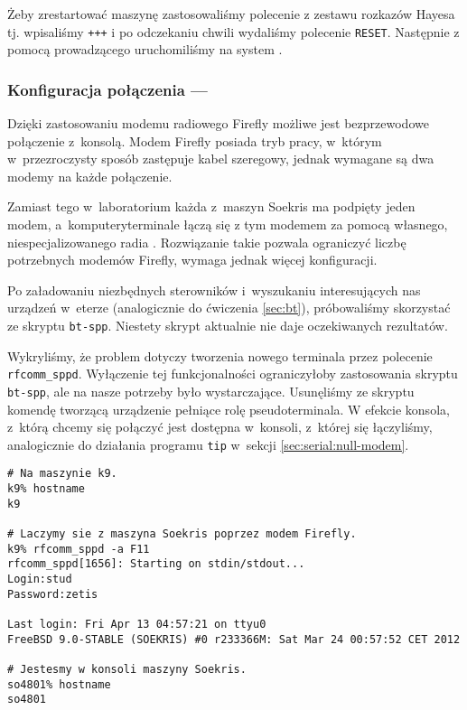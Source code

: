 Żeby zrestartować maszynę \zielone{} zastosowaliśmy polecenie z zestawu rozkazów
Hayesa tj. wpisaliśmy \texttt{+++} i po odczekaniu chwili wydaliśmy polecenie
\texttt{RESET}. Następnie z pomocą prowadzącego uruchomiliśmy na \zielone{}
system \bsd.

\subsubsection{Konfiguracja połączenia --- \bt}

Dzięki zastosowaniu modemu radiowego Firefly możliwe jest bezprzewodowe
połączenie z~konsolą. Modem Firefly posiada tryb pracy, w~którym w~przezroczysty
sposób zastępuje kabel szeregowy, jednak wymagane są dwa modemy na każde
połączenie.

Zamiast tego w~laboratorium każda z~maszyn Soekris ma podpięty jeden modem,
a~komputery\dywiz terminale łączą się z tym modemem za pomocą własnego,
niespecjalizowanego radia \bt. Rozwiązanie takie pozwala ograniczyć liczbę
potrzebnych modemów Firefly, wymaga jednak więcej konfiguracji.

Po załadowaniu niezbędnych sterowników i~wyszukaniu interesujących nas urządzeń
w~eterze (analogicznie do ćwiczenia \ref{sec:bt}), próbowaliśmy skorzystać ze
skryptu \texttt{bt-spp}. Niestety skrypt aktualnie nie daje oczekiwanych
rezultatów.

Wykryliśmy, że problem dotyczy tworzenia nowego terminala przez polecenie
\texttt{rfcomm\_sppd}. Wyłączenie tej funkcjonalności ograniczyłoby zastosowania
skryptu \texttt{bt-spp}, ale na nasze potrzeby było wystarczające. Usunęliśmy ze
skryptu komendę tworzącą urządzenie pełniące rolę pseudo\dywiz terminala. W
efekcie konsola, z~którą chcemy się połączyć jest dostępna w~konsoli, z~której
się łączyliśmy, analogicznie do działania programu \texttt{tip} w~sekcji
\ref{sec:serial:null-modem}.

\begin{lstlisting}[caption={Połączenie z konsolą maszyny Soekris za pomocą programu \texttt{rfcomm\_sppd}.}]
# Na maszynie k9.
k9% hostname
k9

# Laczymy sie z maszyna Soekris poprzez modem Firefly.
k9% rfcomm_sppd -a F11
rfcomm_sppd[1656]: Starting on stdin/stdout...
Login:stud
Password:zetis

Last login: Fri Apr 13 04:57:21 on ttyu0
FreeBSD 9.0-STABLE (SOEKRIS) #0 r233366M: Sat Mar 24 00:57:52 CET 2012

# Jestesmy w konsoli maszyny Soekris.
so4801% hostname
so4801
\end{lstlisting}
